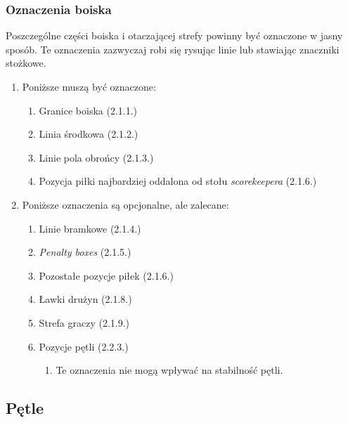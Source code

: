 \documentclass[11pt,a4paper]{article}
\begin{document}
\subsubsection{Oznaczenia boiska}
Poszczególne części boiska i otaczającej strefy powinny być oznaczone w jasny sposób. Te oznaczenia zazwyczaj robi się rysując linie lub stawiając znaczniki stożkowe.
\begin{enumerate}
  \item Poniższe muszą być oznaczone:
  \begin{enumerate}
    \item Granice boiska (2.1.1.) %
    \item Linia środkowa (2.1.2.) %
    \item Linie pola obrońcy (2.1.3.) %
    \item Pozycja piłki najbardziej oddalona od stołu \emph{scorekeepera} (2.1.6.) %
  \end{enumerate}
  \item Poniższe oznaczenia są opcjonalne, ale zalecane:
  \begin{enumerate}
    \item Linie bramkowe (2.1.4.) %
    \item \emph{Penalty boxes} (2.1.5.) %
    \item Pozostałe pozycje piłek (2.1.6.) %
    \item Ławki drużyn (2.1.8.) %
    \item Strefa graczy (2.1.9.) %
    \item Pozycje pętli (2.2.3.) %
    \begin{enumerate}
      \item Te oznaczenia nie mogą wpływać na stabilność pętli.
    \end{enumerate}
  \end{enumerate}
\end{enumerate}


\subsection{Pętle}
\end{document}
